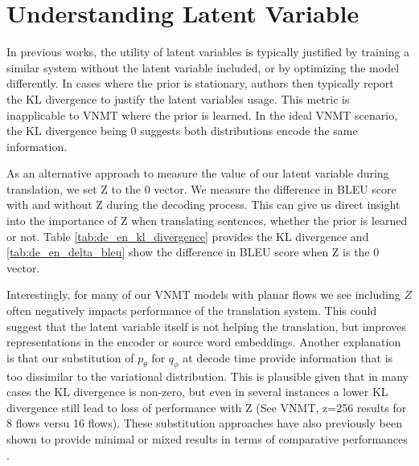 \section{Understanding Latent Variable} 



In previous works, the utility of latent variables is typically justified by training a similar system without the latent variable included, or by optimizing the model differently.  In cases where the prior is stationary, authors then typically report the KL divergence to justify the latent variables usage. This metric is inapplicable to \ac{VNMT} where the prior is learned. In the ideal \ac{VNMT} scenario, the KL divergence being 0 suggests both distributions encode the same information.

As an alternative approach to measure the value of our latent variable during translation, we set Z to the 0 vector. We measure the difference in BLEU score with and without Z during the decoding process. This can give us direct insight into the importance of Z when translating sentences, whether the prior is learned or not. Table \ref{tab:de_en_kl_divergence} provides the KL divergence and \ref{tab:de_en_delta_bleu} show the difference in BLEU score when Z is the 0 vector. 

Interestingly, for many of our \ac{VNMT} models with planar flows we see including $Z$ often negatively impacts performance of the translation system. This could suggest that the latent variable itself is not helping the translation, but improves representations in the encoder or source word embeddings. Another explanation is that our substitution of $p_{\theta}$ for $q_{\phi}$ at decode time provide information that is too dissimilar to the variational distribution. This is plausible given that in many cases the KL divergence is non-zero, but even in several instances a lower KL divergence still lead to loss of performance with Z (See VNMT, z=256 results for 8 flows versu 16 flows). These substitution approaches have also previously been shown to provide minimal or mixed results in terms of comparative performances \cite{eikema2018AEVNMT}.

